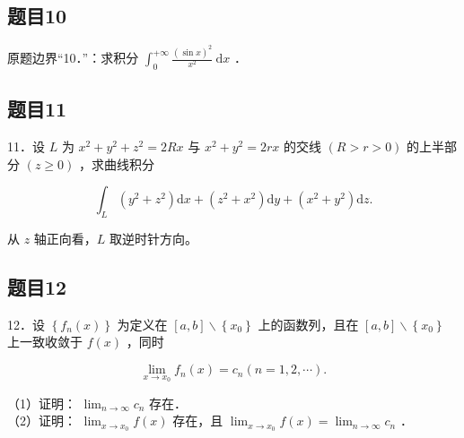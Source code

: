 \documentclass{article}
\begin{document}
\subsection{题目10}
原题边界“10．”：求积分 \(\int_{0}^{+\infty} \frac{(\sin x)^{2}}{x^{2}} \mathrm{~d} x\) ．

\subsection{题目11}
11．设 \(L\) 为 \(x^{2}+y^{2}+z^{2}=2 R x\) 与 \(x^{2}+y^{2}=2 r x\) 的交线 \((R>r>0)\) 的上半部分 \((z \geq 0)\) ，求曲线积分

\[
\int_{L}\left(y^{2}+z^{2}\right) \mathrm{d} x+\left(z^{2}+x^{2}\right) \mathrm{d} y+\left(x^{2}+y^{2}\right) \mathrm{d} z .
\]

从 \(z\) 轴正向看，\(L\) 取逆时针方向。

\subsection{题目12}
12．设 \(\left\{f_{n}(x)\right\}\) 为定义在 \([a, b] \backslash\left\{x_{0}\right\}\) 上的函数列，且在 \([a, b] \backslash\left\{x_{0}\right\}\) 上一致收敛于 \(f(x)\) ，同时

\[
\lim _{x \rightarrow x_{0}} f_{n}(x)=c_{n}(n=1,2, \cdots) .
\]

（1）证明： \(\lim _{n \rightarrow \infty} c_{n}\) 存在．\\
（2）证明： \(\lim _{x \rightarrow x_{0}} f(x)\) 存在，且 \(\lim _{x \rightarrow x_{0}} f(x)=\lim _{n \rightarrow \infty} c_{n}\) ．
\end{document}
